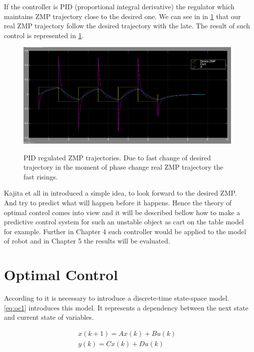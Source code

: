 \documentclass[12pt,a4paper]{report}
\begin{document}
			If the controller is PID (proportional integral derivative) the regulator which maintains ZMP trajectory close to the desired one. We can see in in \cref{fig:10} that our real ZMP trajectory follow the desired trajectory with the late. The result of such control is represented in \cref{fig:10}.
			\begin{figure}[H]
				\vspace{-0.2cm}
				\centering
				{\includegraphics[width=1\textwidth]{10}}
				\caption{PID regulated ZMP trajectories. Due to fast change of desired trajectory in the moment of phase change real ZMP trajectory the fast risings.}
				\label{fig:10}
				\vspace{-0.1cm}
			\end{figure}
			Kajita et all in \cite{kajita2003biped} introduced a simple idea, to look forward to the desired ZMP. And try to predict what will happen before it happens. Hence the theory of optimal control comes into view and it will be described bellow how to make a predictive control system for such an unstable object as cart on the table model for example. Further in Chapter 4 such controller would be applied to the model of robot and in Chapter 5 the results will be evaluated.
			
		\section{Optimal Control}
			According to \cite{hazell2008discrete} it is necessary to introduce a discrete-time state-space model. \ref{eq:oc1} introduces this model. It represents a dependency between the next state and current state of variables.
			
			\begin{equation}\label{eq:oc1}
				\begin{split}
					x(k+1) = Ax(k) + Bu(k)\\
					y(k) = Cx(k) + Du(k)
				\end{split}
			\end{equation}
			
\end{document}
